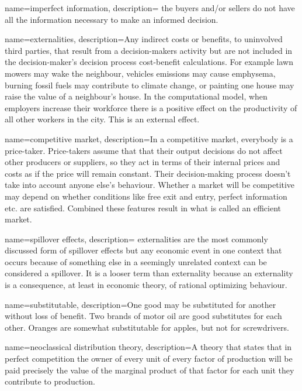 {
name=imperfect information,
description={ the buyers and/or sellers do not have all the information necessary to make an informed decision.}
}

{
name=externalities,
description={Any indirect costs or benefits, to uninvolved third parties, that result from a decision-makers activity but are not included in the decision-maker's decision process cost-benefit calculations. For example lawn mowers may wake the neighbour, vehicles emissions may cause emphysema, burning fossil fuels may contribute to climate change, or painting one house may raise the value of a neighbour's house. In the computational model, when employers increase their workforce there is a positive effect on the productivity of all other workers in the city. This is an external effect.}
}

{
name=competitive market,
description={In a competitive market, everybody is a price-taker. Price-takers  assume that that their output decisions do not affect other producers or suppliers, so they act in terms of their internal prices and costs as if the price will remain constant. Their decision-making process doesn't take into account anyone else's behaviour.
Whether a market will be  competitive may depend on  whether conditions like free exit and entry, perfect information etc. are satisfied. Combined these features result in what is called an \gls{efficient market}.} %
}

{
name=spillover effects,
description={ \Gls{externalities} are the most commonly discussed form of spillover effects but any economic event in one context that occurs because of something else in a seemingly unrelated context can be considered a spillover. It is a looser term than externality because an externality is a consequence, at least in economic theory, of rational optimizing behaviour.}
}

{
name=substitutable,
description={One good may be substituted for another without loss of benefit. Two brands of motor oil are good substitutes for each other. Oranges are somewhat substitutable for apples, but not for screwdrivers.}
}

{
name=neoclassical distribution theory,
description={A theory that states that in perfect competition the owner of every unit of every  \gls{factor of production} will be paid precisely the  value of the \gls{marginal product} of that factor for each unit they contribute to production.}
}

